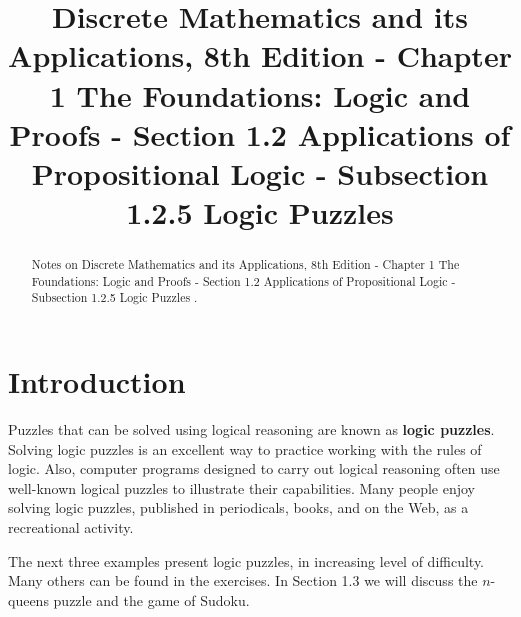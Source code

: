 \documentclass{Axon}
\title{Discrete Mathematics and its Applications, 8th Edition - Chapter 1 The Foundations: Logic and Proofs - Section 1.2 Applications of Propositional Logic - Subsection 1.2.5 Logic Puzzles}
\begin{document}
\maketitle
\makeauthor
\begin{abstract}
Notes on Discrete Mathematics and its Applications, 8th Edition - Chapter 1 The Foundations: Logic and Proofs - Section 1.2 Applications of Propositional Logic - Subsection 1.2.5 Logic Puzzles \cite{Rosen}.
\end{abstract}
\section{Introduction}
Puzzles that can be solved using logical reasoning are known as \textbf{logic puzzles}. Solving logic puzzles is an excellent way to practice working with the rules of logic. Also, computer programs designed to carry out logical reasoning often use well-known logical puzzles to illustrate their capabilities. Many people enjoy solving logic puzzles, published in periodicals, books, and on the Web, as a recreational activity.

The next three examples present logic puzzles, in increasing level of difficulty. Many others can be found in the exercises. In Section 1.3 we will discuss the \(n\)-queens puzzle and the game of Sudoku.
\end{document}
